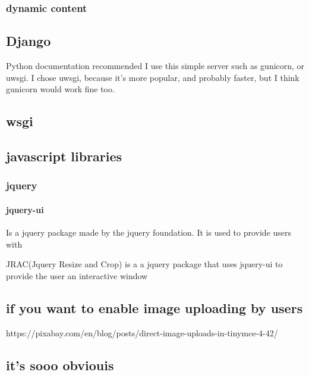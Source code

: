 \subsubsection{dynamic content}


\subsection{Django}

Python documentation recommended I use this simple server such as gunicorn, or uwsgi.  I chose uwsgi, because it's more popular, and probably faster, but I think gunicorn would work fine too.


\subsection{wsgi}





\subsection{javascript libraries}

\subsubsection{jquery}

\paragraph{jquery-ui}

Is a jquery package made by the jquery foundation.  It is used to provide users with 


JRAC(Jquery Resize and Crop) is a a jquery package that uses jquery-ui to provide the user an interactive window 

\subsection{if you want to enable image uploading by users}

https://pixabay.com/en/blog/posts/direct-image-uploads-in-tinymce-4-42/

\subsection{it's sooo obviouis}


